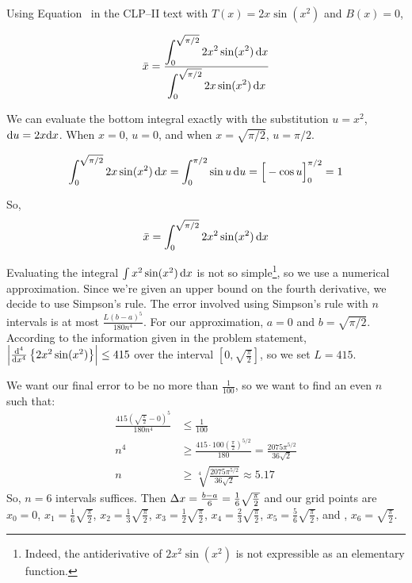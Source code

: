 \begin{solution}
Using Equation~ in the CLP--II text with $T(x) = 2x\sin (x^2)$ and $B(x)=0$,

\[\bar x = \frac{\displaystyle\int_0^{\sqrt{\pi/2}} 2x^2\sin(x^2)\,\mathrm{d}x}{\displaystyle\int_0^{\sqrt{\pi/2}} 2x\sin(x^2)\,\mathrm{d}x}\]

We can evaluate the bottom integral exactly with the substitution $u=x^2$, $\mathrm{d}u=2x\mathrm{d}x$. When $x=0$, $u=0$, and when $x=\sqrt{\pi/2}$, $u=\pi/2$.

\begin{align*}
\int_0^{\sqrt{\pi/2}}2x\sin(x^2)\,\mathrm{d}x&=\int_0^{\pi/2} \sin u\,\mathrm{d}u
=\Big[-\cos u\Big]_0^{\pi/2}=1\\
\end{align*}

So, \[\bar x = \int_0^{\sqrt{\pi/2}} 2x^2\sin(x^2)\,\mathrm{d}x \]

Evaluating the integral $\int x^2\sin(x^2)\,\mathrm{d}x$ is not so simple\footnote{Indeed, the antiderivative of $2x^2\sin(x^2)$ is not expressible as an elementary function.}, so we use a numerical approximation. Since we're given an upper bound on the fourth derivative, we decide to use Simpson's rule. The error involved using Simpson's rule with $n$ intervals is at most $\frac{L(b-a)^5}{180n^4}$. For our approximation,  $a=0$ and $b=\sqrt{\pi/2}$. According to the information given in the problem statement,
$\left|\frac{\mathrm{d}^4}{\mathrm{d}{x}^4}\left\{2x^2\sin(x^2)\right\} \right| \leq 415$ over the interval $\left[0,\sqrt{\frac{\pi}{2}}\right]$, so  we set $L=415$.

We want our final error to be no more than $\frac{1}{100}$, so we want to find an even $n$ such that:
\begin{align*}
\frac{415\left(\sqrt{\frac{\pi}{2}}-0\right)^5}{180n^4} &\leq \frac{1}{100}\\
n^4 &\geq \frac{415\cdot 100\left(\frac{\pi}{2}\right)^{5/2}}{180} = \frac{2075\pi^{5/2}}{36\sqrt{2}}\\
n&\geq \sqrt[4]{\frac{2075\pi^{5/2}}{36\sqrt{2}}}\approx 5.17
\end{align*}
So, $n=6$ intervals suffices. Then $\Delta x = \frac{b-a}{6} = \frac{1}{6}\sqrt{\frac{\pi}{2}}$ and our grid points are $x_0=0$, $x_1=\frac{1}{6}\sqrt{\frac{\pi}{2}}$, $x_2=\frac{1}{3}\sqrt{\frac{\pi}{2}}$, $x_3=\frac{1}{2}\sqrt{\frac{\pi}{2}}$, $x_4=\frac{2}{3}\sqrt{\frac{\pi}{2}}$, $x_5=\frac{5}{6}\sqrt{\frac{\pi}{2}}$, and , $x_6=\sqrt{\frac{\pi}{2}}$.


\end{solution}
